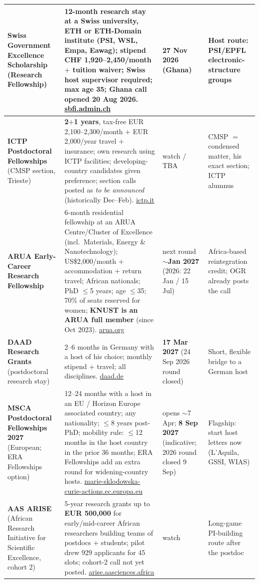 \documentclass[11pt,a4paper]{article}
\begin{document}
\begin{longtable}{@{}p{3.3cm}p{5.6cm}p{2.2cm}p{2.8cm}@{}}
\midrule
\textbf{Swiss Government Excellence Scholarship} (Research Fellowship) & 12-month research stay at a Swiss university, ETH or ETH-Domain institute (PSI, WSL, Empa, Eawag); stipend CHF 1{,}920--2{,}450/month $+$ tuition waiver; Swiss host supervisor required; max age 35; Ghana call opened 20 Aug 2026. \href{https://www.sbfi.admin.ch/en/swiss-government-excellence-scholarships}{sbfi.admin.ch} & \textbf{27 Nov 2026} (Ghana) & Host route: PSI/EPFL electronic-structure groups \\
\midrule
\textbf{ICTP Postdoctoral Fellowships} (CMSP section, Trieste) & \textbf{2$+$1 years}, tax-free EUR 2{,}100--2{,}300/month $+$ EUR 2{,}000/year travel $+$ insurance; own research using ICTP facilities; developing-country candidates given preference; section calls posted as \emph{to be announced} (historically Dec--Feb). \href{https://www.ictp.it/home/postdoctoral-opportunities}{ictp.it} & watch / TBA & CMSP $=$ condensed matter, his exact section; ICTP alumnus \\
\midrule
\textbf{ARUA Early-Career Research Fellowship} & 6-month residential fellowship at an ARUA Centre/Cluster of Excellence (incl.\ Materials, Energy \& Nanotechnology); US\$2{,}000/month $+$ accommodation $+$ return travel; African nationals; PhD $\leq$5 years; age $\leq$35; 70\% of seats reserved for women; \textbf{KNUST is an ARUA full member} (since Oct 2023). \href{https://arua.org/early-career-research-fellowships}{arua.org} & next round $\sim$\textbf{Jan 2027} (2026: 22 Jan / 15 Jul) & Africa-based reintegration credit; OGR already posts the call \\
\midrule
\textbf{DAAD Research Grants} (postdoctoral research stay) & 2--6 months in Germany with a host of his choice; monthly stipend $+$ travel; all disciplines. \href{https://www2.daad.de/deutschland/stipendium/datenbank/en/21148-scholarship-database/?detail=57742121}{daad.de} & \textbf{17 Mar 2027} (24 Sep 2026 round closed) & Short, flexible bridge to a German host \\
\midrule
\textbf{MSCA Postdoctoral Fellowships 2027} (European; ERA Fellowships option) & 12--24 months with a host in an EU / Horizon Europe associated country; any nationality; $\leq$8 years post-PhD; mobility rule: $\leq$12 months in the host country in the prior 36 months; ERA Fellowships add an extra round for widening-country hosts. \href{https://marie-sklodowska-curie-actions.ec.europa.eu/funding/msca-postdoctoral-fellowships-2027}{marie-sklodowska-curie-actions.ec.europa.eu} & opens $\sim$7 Apr; \textbf{8 Sep 2027} (indicative; 2026 round closed 9 Sep) & Flagship: start host letters now (L'Aquila, GSSI, WIAS) \\
\midrule
\textbf{AAS ARISE} (African Research Initiative for Scientific Excellence, cohort 2) & 5-year research grants up to \textbf{EUR 500{,}000} for early/mid-career African researchers building teams of postdocs $+$ students; pilot drew 929 applicants for 45 slots; cohort-2 call not yet posted. \href{https://arise.aasciences.africa/}{arise.aasciences.africa} & watch & Long-game PI-building route after the postdoc \\
\bottomrule
\end{longtable}
\end{document}
